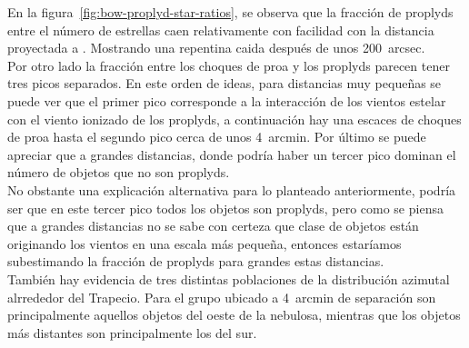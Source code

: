 En la figura~\ref{fig:bow-proplyd-star-ratios}, se observa que la fracción de proplyds entre el número de estrellas caen relativamente con facilidad con la distancia proyectada a \thC{}. Mostrando una repentina caida después de unos 200~arcsec.\\

Por otro lado la fracción entre los choques de proa y los proplyds parecen tener tres picos separados. En este orden de ideas, para distancias muy pequeñas se puede ver que el primer pico corresponde a la interacción de los vientos estelar con el viento ionizado de los proplyds, a continuación hay una escaces de choques de proa hasta el segundo pico cerca de unos 4~arcmin. Por último se puede apreciar que  a grandes distancias, donde podría haber un tercer pico dominan el número de objetos que no son proplyds.\\

No obstante una explicación alternativa para lo planteado anteriormente, podría ser que en este tercer pico todos los objetos son proplyds, pero como se piensa que a grandes distancias no se sabe con certeza que clase de objetos están originando los vientos en una escala más pequeña, entonces estaríamos subestimando  la fracción de proplyds para grandes estas distancias.\\

También hay evidencia de tres distintas poblaciones de la distribución azimutal alrrededor del Trapecio. Para el grupo ubicado a 4~arcmin de separación son principalmente aquellos objetos del oeste de la nebulosa, mientras que los objetos más distantes son principalmente los del sur.    

%

%
